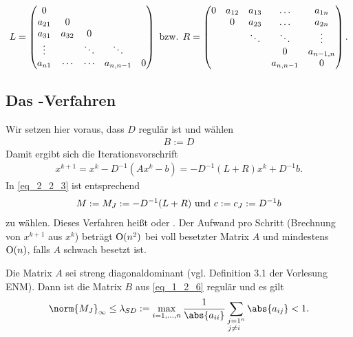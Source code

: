 \begin{align}
	L = 
	\begin{pmatrix}
		0      &        &        &           & \\
		a_{21} & 0      &        &           & \\
		a_{31} & a_{32} & 0      &           & \\
		\vdots &        & \ddots & \ddots    & \\
		a_{n1} & \cdots & \cdots & a_{n,n-1} & 0
	\end{pmatrix}
	 \text{ bzw. } R = 
	 \begin{pmatrix}
	 0      & a_{12} & a_{13} & \dots     & a_{1n}\\
	        & 0      & a_{23} & \dots     & a_{2n}\\
	        &        & \ddots & \ddots    & \vdots\\
	        &        &        & 0         & a_{n-1,n}\\
	        &        &        & a_{n,n-1} & 0
	 \end{pmatrix}.\notag
\end{align}

\subsection{Das -Verfahren}
Wir setzen hier voraus, dass $D$ regulär ist und wählen
\begin{align}
	B:= D \label{eq_1_2_6}
\end{align}
Damit ergibt sich die Iterationsvorschrift
\begin{align}
	x^{k+1} = x^k - D^{-1}(Ax^k - b) = -D^{-1}(L+R)x^k+D^{-1}b. \label{eq_1_2_7}
\end{align}
In \eqref{eq_2_2_3} ist entsprechend
\begin{align}
	M:= M_J := -D^{-1}(L+R) \text{ und } c:= c_J := D^{-1}b\notag 
\end{align}
zu wählen. Dieses Verfahren heißt  oder . Der Aufwand pro Schritt (Brechnung von $x^{k+1}$ aus $x^k$) beträgt $\operatorname{O}(n^2)$ bei voll besetzter Matrix $A$ und mindestens $\operatorname{O}(n)$, falls $A$ schwach besetzt ist.

\begin{proposition}
	Die Matrix $A$ sei streng diagonaldominant (vgl. Definition 3.1 der Vorlesung ENM). Dann ist die Matrix $B$ aus \eqref{eq_1_2_6} regulär und es gilt
	\begin{align}
	\norm{M_J}_{\infty} \le \lambda_{SD} := \max_{i = 1,\dots,n} \frac{1}{\abs{a_{ii}}} \sum_{\substack{j =1 \\ j\neq i}^{n}} \abs{a_{ij}} < 1. \notag
	\end{align}
\end{proposition}

